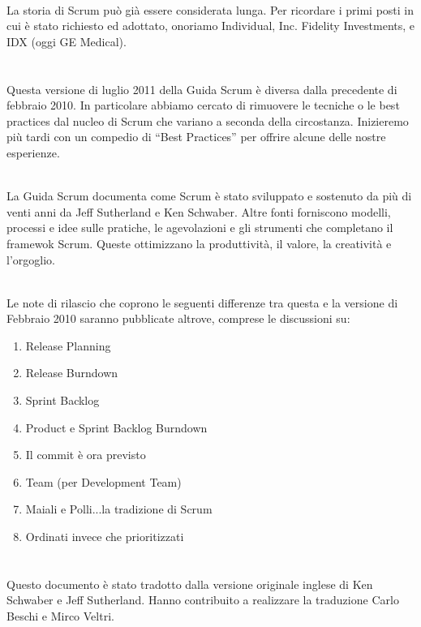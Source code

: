 \\La storia di Scrum pu\`o gi\`a essere considerata lunga. Per ricordare i primi posti in cui \`e stato richiesto ed adottato, onoriamo Individual, Inc. Fidelity Investments, e IDX (oggi GE Medical).

\newpage
\section*{\color{Blue}{Revisioni}}%
\label{sec:revisions}
Questa versione di luglio 2011 della Guida Scrum è diversa dalla precedente di febbraio 2010. In particolare abbiamo cercato di 
rimuovere le tecniche o le best practices dal nucleo di Scrum che variano a seconda della circostanza. Inizieremo pi\`u 
tardi con un compedio di ``Best Practices'' per offrire alcune delle nostre esperienze. \newline

\\La Guida Scrum documenta come Scrum \`e stato sviluppato e sostenuto da pi\`u di venti anni da Jeff Sutherland e Ken Schwaber. 
Altre fonti forniscono modelli, processi e idee sulle pratiche, le agevolazioni e gli strumenti che completano il framewok 
Scrum. Queste ottimizzano la produttività, il valore, la creatività e l'orgoglio. \newline

\\Le note di rilascio che coprono le seguenti differenze tra questa e la versione di Febbraio 2010 saranno pubblicate altrove, 
comprese le discussioni su:

\begin{enumerate}
 	\item Release Planning
	\item Release Burndown
	\item Sprint Backlog
	\item Product e Sprint Backlog Burndown
	\item Il commit \`e ora previsto
	\item Team (per Development Team)
	\item Maiali e Polli...la tradizione di Scrum
	\item Ordinati invece che prioritizzati 
\end{enumerate}

\newpage
\section*{\color{Blue}{Traduzione}}%
\label{sec:translation}
Questo documento \`e stato tradotto dalla versione originale inglese di Ken Schwaber e Jeff Sutherland. Hanno contribuito a 
realizzare la traduzione Carlo Beschi e Mirco Veltri.

